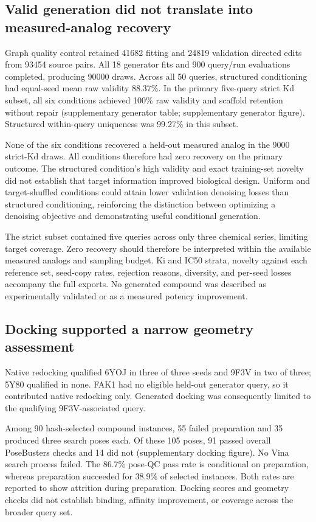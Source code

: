 \documentclass[12pt,a4paper]{article}
\begin{document}
\nolinenumbers\linenumbers
\subsection*{Valid generation did not translate into measured-analog recovery}
Graph quality control retained 41682 fitting and 24819 validation directed edits from 93454 source pairs. All 18 generator fits and 900 query/run evaluations completed, producing 90000 draws. Across all 50 queries, structured conditioning had equal-seed mean raw validity 88.37\%. In the primary five-query strict Kd subset, all six conditions achieved 100\% raw validity and scaffold retention without repair (supplementary generator table; supplementary generator figure). Structured within-query uniqueness was 99.27\% in this subset.

None of the six conditions recovered a held-out measured analog in the 9000 strict-Kd draws. All conditions therefore had zero recovery on the primary outcome. The structured condition's high validity and exact training-set novelty did not establish that target information improved biological design. Uniform and target-shuffled conditions could attain lower validation denoising losses than structured conditioning, reinforcing the distinction between optimizing a denoising objective and demonstrating useful conditional generation.

The strict subset contained five queries across only three chemical series, limiting target coverage. Zero recovery should therefore be interpreted within the available measured analogs and sampling budget. Ki and IC50 strata, novelty against each reference set, seed-copy rates, rejection reasons, diversity, and per-seed losses accompany the full exports. No generated compound was described as experimentally validated or as a measured potency improvement.

\nolinenumbers\linenumbers
\subsection*{Docking supported a narrow geometry assessment}
Native redocking qualified 6YOJ in three of three seeds and 9F3V in two of three; 5Y80 qualified in none. FAK1 had no eligible held-out generator query, so it contributed native redocking only. Generated docking was consequently limited to the qualifying 9F3V-associated query.

Among 90 hash-selected compound instances, 55 failed preparation and 35 produced three search poses each. Of these 105 poses, 91 passed overall PoseBusters checks and 14 did not (supplementary docking figure). No Vina search process failed. The 86.7\% pose-QC pass rate is conditional on preparation, whereas preparation succeeded for 38.9\% of selected instances. Both rates are reported to show attrition during preparation. Docking scores and geometry checks did not establish binding, affinity improvement, or coverage across the broader query set.
\end{document}
